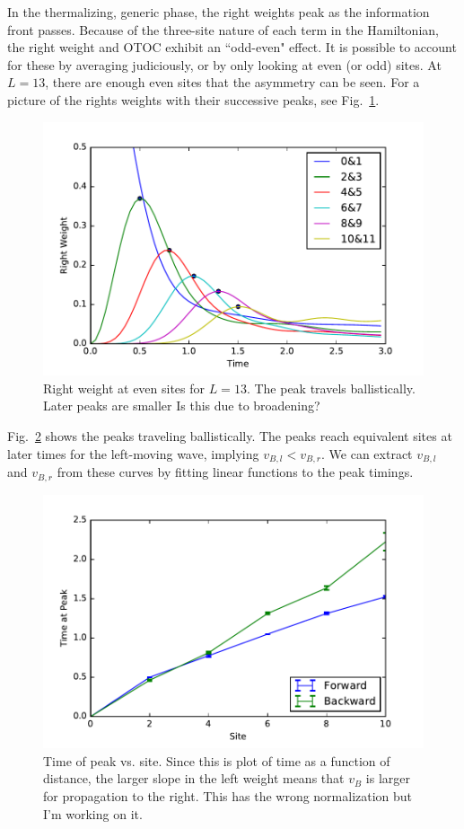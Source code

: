 \documentclass[aps,prl,reprint,superscriptaddress, longbibliography]{revtex4-1}
\newcommand{\charlie}[1]{ {\color{Magenta} {{#1}}}}
\begin{document}
In the thermalizing, generic phase, the right weights peak as the information front passes. Because of the three-site nature of each term in the Hamiltonian, the right weight and OTOC exhibit an ``odd-even" effect. It is possible to account for these by averaging judiciously, or by only looking at even (or odd) sites. At $L=13$, there are enough even sites that the asymmetry can be seen. For a picture of the rights weights with their successive peaks, see Fig.~\ref{fig:Rweightpeakshape}. 

\begin{figure}
	\includegraphics[width=\columnwidth]{Rweightpeakshape}
	\caption{Right weight at even sites for $L=13$. The peak travels ballistically. Later peaks are smaller \charlie{Is this due to broadening?}}
	\label{fig:Rweightpeakshape}
\end{figure}

Fig.~\ref{fig:Rweightpeaktimes} shows the peaks traveling ballistically. The peaks reach equivalent sites at later times for the left-moving wave, implying $v_{B,l}<v_{B,r}$. We can extract $v_{B,l}$ and $v_{B,r}$ from these curves by fitting linear functions to the peak timings.

\begin{figure}
	\includegraphics[width=\columnwidth]{Rweightpeaktimes}
	\caption{Time of peak vs. site. Since this is plot of time as a function of distance, the larger slope in the left weight means that $v_B$ is larger for propagation to the right. \charlie{This has the wrong normalization but I'm working on it.}}
	\label{fig:Rweightpeaktimes}
\end{figure}
\end{document}
